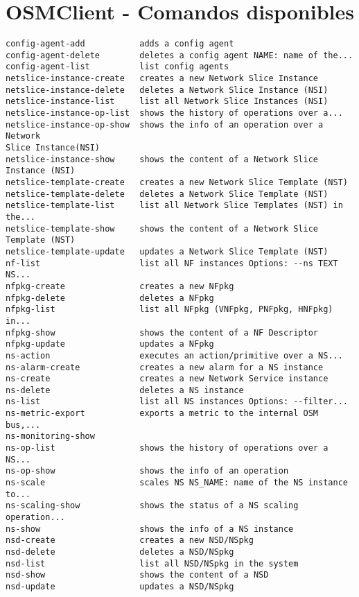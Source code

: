 \chapter{OSMClient - Comandos disponibles}
\label{sec:anexoosmclient}

\begin{lstlisting}
config-agent-add           adds a config agent
config-agent-delete        deletes a config agent NAME: name of the...
config-agent-list          list config agents
netslice-instance-create   creates a new Network Slice Instance
netslice-instance-delete   deletes a Network Slice Instance (NSI)
netslice-instance-list     list all Network Slice Instances (NSI)
netslice-instance-op-list  shows the history of operations over a...
netslice-instance-op-show  shows the info of an operation over a Network
Slice Instance(NSI)
netslice-instance-show     shows the content of a Network Slice Instance (NSI)
netslice-template-create   creates a new Network Slice Template (NST)
netslice-template-delete   deletes a Network Slice Template (NST)
netslice-template-list     list all Network Slice Templates (NST) in the...
netslice-template-show     shows the content of a Network Slice Template (NST)
netslice-template-update   updates a Network Slice Template (NST)
nf-list                    list all NF instances Options: --ns TEXT NS...
nfpkg-create               creates a new NFpkg
nfpkg-delete               deletes a NFpkg
nfpkg-list                 list all NFpkg (VNFpkg, PNFpkg, HNFpkg) in...
nfpkg-show                 shows the content of a NF Descriptor
nfpkg-update               updates a NFpkg
ns-action                  executes an action/primitive over a NS...
ns-alarm-create            creates a new alarm for a NS instance
ns-create                  creates a new Network Service instance
ns-delete                  deletes a NS instance
ns-list                    list all NS instances Options: --filter...
ns-metric-export           exports a metric to the internal OSM bus,...
ns-monitoring-show
ns-op-list                 shows the history of operations over a NS...
ns-op-show                 shows the info of an operation
ns-scale                   scales NS NS_NAME: name of the NS instance to...
ns-scaling-show            shows the status of a NS scaling operation...
ns-show                    shows the info of a NS instance
nsd-create                 creates a new NSD/NSpkg
nsd-delete                 deletes a NSD/NSpkg
nsd-list                   list all NSD/NSpkg in the system
nsd-show                   shows the content of a NSD
nsd-update                 updates a NSD/NSpkg

\end{lstlisting}
